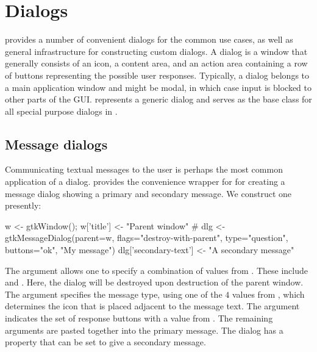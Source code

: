 \section{Dialogs}
\label{sec:dialogs}

\GTK\/ provides a number of convenient dialogs for the common use
cases, as well as general infrastructure for constructing custom
dialogs.  A dialog is a window that generally consists of an icon, a
content area, and an action area containing a row of buttons
representing the possible user responses.  Typically, a dialog belongs
to a main application window and might be modal, in which case input
is blocked to other parts of the GUI.  
represents a generic dialog and serves as the base class for all
special purpose dialogs in \GTK.

\subsection{Message dialogs}
\label{sec:gtk-dialog-message}

Communicating textual messages to the user is perhaps the most common
application of a dialog. \GTK\/ provides the
 convenience wrapper for
 for creating a message dialog showing a primary and
secondary message.  We construct one presently:
\begin{Schunk}
\begin{Sinput}
 w <- gtkWindow(); w['title'] <- "Parent window"
 #
 dlg <- gtkMessageDialog(parent=w, 
                         flags="destroy-with-parent",
                         type="question", 
                         buttons="ok",
                         "My message")
 dlg['secondary-text'] <- "A secondary message"
\end{Sinput}
\end{Schunk}
%

The  argument allows one to specify
a combination of values from . These include
 and . Here, the dialog will be
destroyed upon destruction of the parent window. The
 argument specifies the message type,
using one of the $4$ values from , which
determines the icon that is placed adjacent to the message text. The
 argument indicates the set of
response buttons with a value from . The
remaining arguments are pasted together into the primary message.  The
dialog has a  property that can be set to give a
secondary message.

